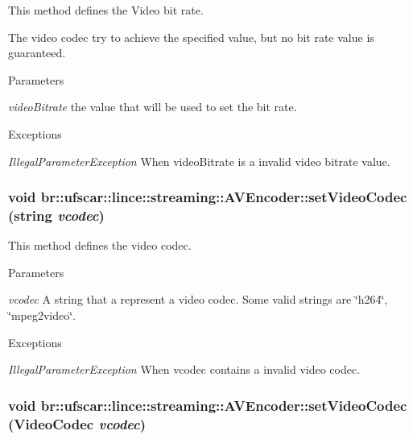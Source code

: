 This method defines the Video bit rate. 

The video codec try to achieve the specified value, but no bit rate value is guaranteed. 
\begin{DoxyParams}{Parameters}
\item[{\em videoBitrate}]the value that will be used to set the bit rate. \end{DoxyParams}

\begin{DoxyExceptions}{Exceptions}
\item[{\em IllegalParameterException}]When videoBitrate is a invalid video bitrate value. \end{DoxyExceptions}
\hypertarget{classbr_1_1ufscar_1_1lince_1_1streaming_1_1AVEncoder_abeb4f6a9e0fd63048e57dd7c6ef12de9}{
\subsubsection[{setVideoCodec}]{\setlength{\rightskip}{0pt plus 5cm}void br::ufscar::lince::streaming::AVEncoder::setVideoCodec (string {\em vcodec})}}
\label{classbr_1_1ufscar_1_1lince_1_1streaming_1_1AVEncoder_abeb4f6a9e0fd63048e57dd7c6ef12de9}


This method defines the video codec. 


\begin{DoxyParams}{Parameters}
\item[{\em vcodec}]A string that a represent a video codec. Some valid strings are \char`\"{}h264\char`\"{}, \char`\"{}mpeg2video\char`\"{}. \end{DoxyParams}

\begin{DoxyExceptions}{Exceptions}
\item[{\em IllegalParameterException}]When vcodec contains a invalid video codec. \end{DoxyExceptions}
\hypertarget{classbr_1_1ufscar_1_1lince_1_1streaming_1_1AVEncoder_aece976fc8feb135ee127ae3d2c7d5115}{
\subsubsection[{setVideoCodec}]{\setlength{\rightskip}{0pt plus 5cm}void br::ufscar::lince::streaming::AVEncoder::setVideoCodec ({\bf VideoCodec} {\em vcodec})}}
\label{classbr_1_1ufscar_1_1lince_1_1streaming_1_1AVEncoder_aece976fc8feb135ee127ae3d2c7d5115}


